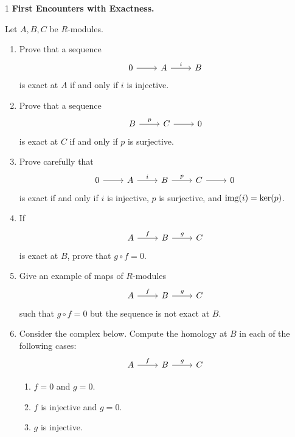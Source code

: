 \documentclass[Notebook.tex]{subfiles}
\begin{document}
\begin{problem}{1} \textbf{First Encounters with Exactness.} 
    
    Let $A,B,C$ be $R$-modules.
    \begin{enumerate}
        \item Prove that a sequence
        \[
        \begin{tikzcd}
        0 \arrow[r] & A \arrow[r, "i"] & B
        \end{tikzcd}
        \]
        is exact at $A$ if and only if $i$ is injective.
        \item Prove that a sequence
        \[
        \begin{tikzcd}
        B \arrow[r, "p"] & C \arrow[r] & 0
        \end{tikzcd}
        \]
        is exact at $C$ if and only if $p$ is surjective.
        \item Prove carefully that
        \[
        \begin{tikzcd}
        0 \arrow[r] & A \arrow[r, "i"] & B \arrow[r, "p"] & C \arrow[r] & 0
        \end{tikzcd}
        \]
        is exact if and only if $i$ is injective, $p$ is surjective, and $\operatorname{img}(i)=\ker(p)$.
        \item If
        \[
        \begin{tikzcd}
        A \arrow[r, "f"] & B \arrow[r, "g"] & C
        \end{tikzcd}
        \]
        is exact at $B$, prove that $g\circ f=0$.
        \item Give an example of maps of $R$-modules
        \[
        \begin{tikzcd}
        A \arrow[r, "f"] & B \arrow[r, "g"] & C
        \end{tikzcd}
        \]
        such that $g\circ f=0$ but the sequence is not exact at $B$.
        \item Consider the complex below. Compute the homology at $B$ in each of the following cases:
        \[
        \begin{tikzcd}
        A \arrow[r, "f"] & B \arrow[r, "g"] & C
        \end{tikzcd}
        \]
        \begin{enumerate}
        \item $f=0$ and $g=0$.
        \item $f$ is injective and $g=0$.
        \item $g$ is injective.
        \end{enumerate}
    \end{enumerate}
\end{problem}
\end{document}

